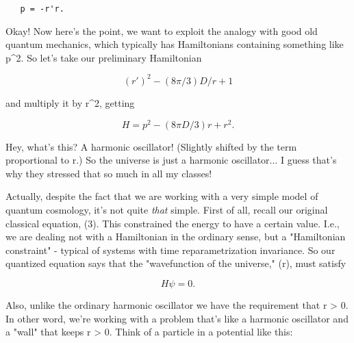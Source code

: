 \begin{verbatim}
   p = -r'r.
\end{verbatim}
    

Okay!  Now here's the point, we want to exploit the analogy with good
old quantum mechanics, which typically has Hamiltonians containing
something like p^{2}.  So let's take our preliminary Hamiltonian

$$
   (r')^{2} - (8\pi /3) D/r + 1
$$
    

and multiply it by r^{2}, getting

$$
   H = p^{2} - (8\pi  D/3)r + r^{2}.
$$
    

Hey, what's this?  A harmonic oscillator!  (Slightly shifted by the 
term proportional to r.)  So the universe is just a harmonic
oscillator... I guess that's why they stressed that so much in all my
classes! 

Actually, despite the fact that we are working with a very simple model
of quantum cosmology, it's not quite \emph{that} simple.  First of all,
recall our original classical equation, (3).  This constrained the
energy to have a certain value.  I.e., we are dealing not with a
Hamiltonian in the ordinary sense, but a "Hamiltonian constraint" -
typical of systems with time reparametrization invariance.  So our
quantized equation says that the "wavefunction of the universe," \psi (r),
must satisfy

$$
  H \psi  = 0.
$$
    

Also, unlike the ordinary harmonic oscillator we have the requirement
that r > 0.  In other word, we're working with a problem that's like a
harmonic oscillator and a "wall" that keeps r > 0.   Think of a particle
in a potential like this:





